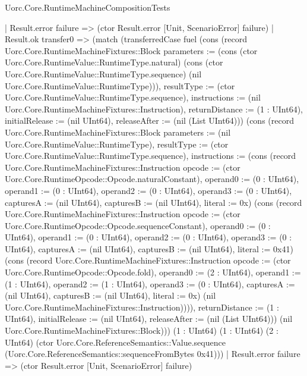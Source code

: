 \begin{lexlean}{Uorc.Core.RuntimeMachineCompositionTests}
\begin{semanticmodule}
{    | Result.error failure => (ctor Result.error [Unit, ScenarioError] failure)
    | Result.ok transfer0 => (match (transferredCase fuel (cons (record Uorc.Core.RuntimeMachineFixtures::Block {parameters := (cons (ctor Uorc.Core.RuntimeValue::RuntimeType.natural) (cons (ctor Uorc.Core.RuntimeValue::RuntimeType.sequence) (nil Uorc.Core.RuntimeValue::RuntimeType))), resultType := (ctor Uorc.Core.RuntimeValue::RuntimeType.sequence), instructions := (nil Uorc.Core.RuntimeMachineFixtures::Instruction), returnDistance := (1 : UInt64), initialRelease := (nil UInt64), releaseAfter := (nil (List UInt64))}) (cons (record Uorc.Core.RuntimeMachineFixtures::Block {parameters := (nil Uorc.Core.RuntimeValue::RuntimeType), resultType := (ctor Uorc.Core.RuntimeValue::RuntimeType.sequence), instructions := (cons (record Uorc.Core.RuntimeMachineFixtures::Instruction {opcode := (ctor Uorc.Core.RuntimeOpcode::Opcode.naturalConstant), operand0 := (0 : UInt64), operand1 := (0 : UInt64), operand2 := (0 : UInt64), operand3 := (0 : UInt64), capturesA := (nil UInt64), capturesB := (nil UInt64), literal := 0x}) (cons (record Uorc.Core.RuntimeMachineFixtures::Instruction {opcode := (ctor Uorc.Core.RuntimeOpcode::Opcode.sequenceConstant), operand0 := (0 : UInt64), operand1 := (0 : UInt64), operand2 := (0 : UInt64), operand3 := (0 : UInt64), capturesA := (nil UInt64), capturesB := (nil UInt64), literal := 0x41}) (cons (record Uorc.Core.RuntimeMachineFixtures::Instruction {opcode := (ctor Uorc.Core.RuntimeOpcode::Opcode.fold), operand0 := (2 : UInt64), operand1 := (1 : UInt64), operand2 := (1 : UInt64), operand3 := (0 : UInt64), capturesA := (nil UInt64), capturesB := (nil UInt64), literal := 0x}) (nil Uorc.Core.RuntimeMachineFixtures::Instruction)))), returnDistance := (1 : UInt64), initialRelease := (nil UInt64), releaseAfter := (nil (List UInt64))}) (nil Uorc.Core.RuntimeMachineFixtures::Block))) (1 : UInt64) (1 : UInt64) (2 : UInt64) (ctor Uorc.Core.ReferenceSemantics::Value.sequence (Uorc.Core.ReferenceSemantics::sequenceFromBytes 0x41)))
      | Result.error failure => (ctor Result.error [Unit, ScenarioError] failure)
}
\end{semanticmodule}
\end{lexlean}
